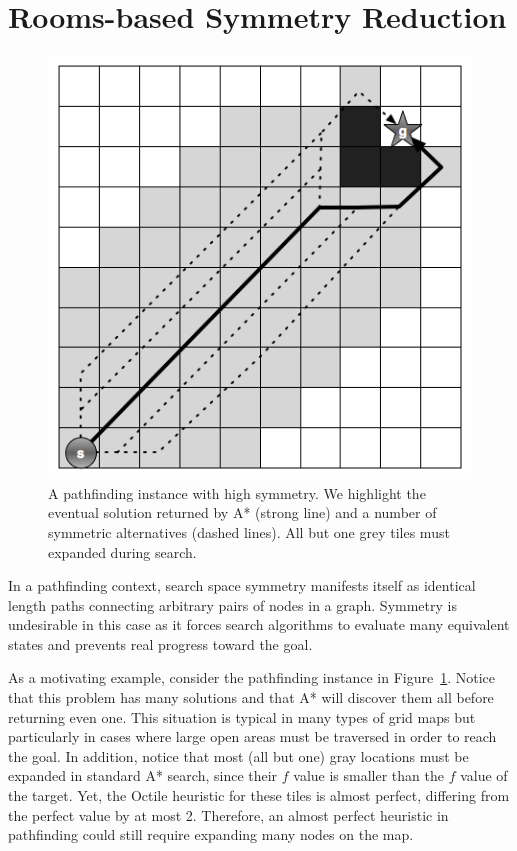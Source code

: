 \section{Rooms-based Symmetry Reduction}
\begin{figure}[]
       \begin{center}
                       \includegraphics[scale=0.30]{diagrams/symmetry_example.png}
       \end{center}
       \caption{A pathfinding instance with high symmetry. We highlight the
eventual solution returned by A* (strong line) and a number of symmetric 
alternatives (dashed lines). All but one grey tiles must expanded during search. }
       \label{fig-symmetry}
		\vspace{-0.5em}
\end{figure}
In a pathfinding context, search space symmetry manifests itself as identical
length paths connecting arbitrary pairs of nodes in a graph. 
Symmetry is undesirable in this case as it forces search algorithms to evaluate 
many equivalent states and prevents real progress toward the goal.

As a motivating example, consider the pathfinding instance in Figure~\ref{fig-symmetry}. 
Notice that this problem has many solutions and that A* will
discover them all before returning even one. This situation is typical in many
types of grid maps but particularly in cases where large open areas must be
traversed in order to reach the goal.
In addition, notice that most (all but one) gray locations must be expanded
in standard A* search, since their $f$
value is smaller than the $f$ value of the target. Yet, the Octile heuristic
for these tiles is almost perfect, differing from the perfect value by at most 2.
Therefore, an almost perfect heuristic in pathfinding could still require
expanding many nodes on the map.

